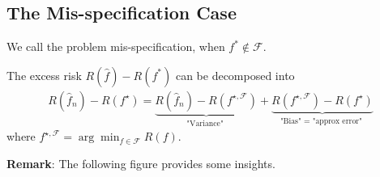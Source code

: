 \subsection{The Mis-specification Case}
We call the problem mis-specification, when $f^* \not\in \mathcal{F}$.
\begin{theorem}
The excess risk $R(\hat{f}) - R(f^*)$ can be decomposed into 
\begin{align*} 
R(\widehat{f}_{n})-R\left(f^{\star}\right)=\underbrace{R(\widehat{f}_{n})-R\left(f^{\star, \mathcal{F}}\right)}_{\text {"Variance" }}+\underbrace{R\left(f^{\star, \mathcal{F}}\right)-R\left(f^{\star}\right)}_{\text {"Bias" }=\text { "approx error" }}
\end{align*}
where $f^{\star, \mathcal{F}} = \arg\min_{f\in\mathcal{F}} R(f)$.
\end{theorem}
\textbf{Remark}: The following figure provides some insights.
